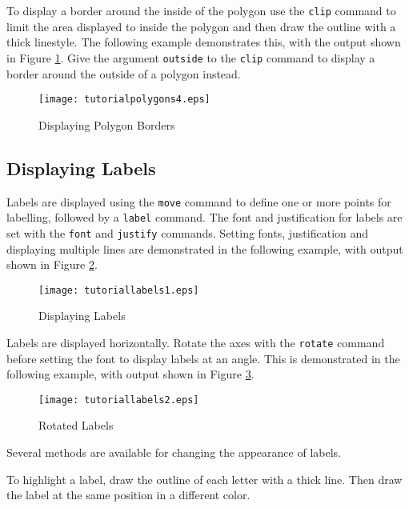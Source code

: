To display a border around the inside of the polygon
use the \texttt{clip}
command to limit the area displayed to inside the polygon
and then draw the outline with a thick linestyle.
The following example demonstrates this, with the output shown
in Figure \ref{tutorialpolygons4}.
Give the argument \texttt{outside}
to the \texttt{clip} command
to display a border around the outside of a polygon instead.



\begin{figure}[htb]
\texttt{[image: tutorialpolygons4.eps]}
\caption{Displaying Polygon Borders}
\label{tutorialpolygons4}
\end{figure}

\subsection{Displaying Labels}

Labels are displayed using the \texttt{move}
command to define one or more points for labelling, followed by a
\texttt{label} command.  The font and justification for labels
are set with the \texttt{font} and \texttt{justify} commands.
Setting fonts, justification and displaying multiple lines
are demonstrated in the following example, with output
shown in Figure \ref{tutoriallabels1}.



\begin{figure}[htb]
\texttt{[image: tutoriallabels1.eps]}
\caption{Displaying Labels}
\label{tutoriallabels1}
\end{figure}

Labels are displayed horizontally.  Rotate the axes with the \texttt{rotate}
command before setting the font to display labels at an angle.
This is demonstrated in the following example,
with output shown in Figure \ref{tutoriallabels2}.



\begin{figure}[htb]
\texttt{[image: tutoriallabels2.eps]}
\caption{Rotated Labels}
\label{tutoriallabels2}
\end{figure}

Several methods are available for changing the appearance of labels.

To highlight a label, draw the outline of each letter with a thick line.
Then draw the label at the same position in a different color.

